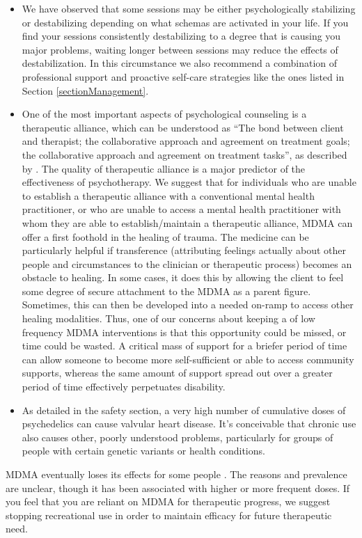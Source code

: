 \documentclass[12pt,letterpaper]{book}
\begin{document}
\begin{itemize}
    \item We have observed that some sessions may be either psychologically stabilizing or destabilizing depending on what schemas are activated in your life. If you find your sessions consistently destabilizing to a degree that is causing you major problems, waiting longer between sessions may reduce the effects of destabilization. In this circumstance we also recommend a combination of professional support and proactive self-care strategies like the ones listed in Section \ref{sectionManagement}.
    \item One of the most important aspects of psychological counseling is a therapeutic alliance, which can be understood as “The bond between client and therapist; the collaborative approach and agreement on treatment goals; the collaborative approach and agreement on treatment tasks”, as described by \textcite{BRWAIdownload}. The quality of therapeutic alliance is a major predictor of the effectiveness of psychotherapy. We suggest that for individuals who are unable to establish a therapeutic alliance with a conventional mental health practitioner, or who are unable to access a mental health practitioner with whom they are able to establish/maintain a therapeutic alliance, MDMA can offer a first foothold in the healing of trauma. The medicine can be particularly helpful if transference (attributing feelings actually about other people and circumstances to the clinician or therapeutic process) becomes an obstacle to healing. In some cases, it does this by allowing the client to feel some degree of secure attachment to the MDMA as a parent figure. Sometimes, this can then be developed into a needed on-ramp to access other healing modalities. Thus, one of our concerns about keeping a of low frequency MDMA interventions is that this opportunity could be missed, or time could be wasted. A critical mass of support for a briefer period of time can allow someone to become more self-sufficient or able to access community supports, whereas the same amount of support spread out over a greater period of time effectively perpetuates disability.
    \item As detailed in the safety section, a very high number of cumulative doses of psychedelics can cause valvular heart disease. It's conceivable that chronic use also causes other, poorly understood problems, particularly for groups of people with certain genetic variants or health conditions.
\end{itemize}

MDMA eventually loses its effects for some people \cite{farreTolerance,parrottTolerance}. The reasons and prevalence are unclear, though it has been associated with higher or more frequent doses. If you feel that you are reliant on MDMA for therapeutic progress, we suggest stopping recreational use in order to maintain efficacy for future therapeutic need.
\end{document}
